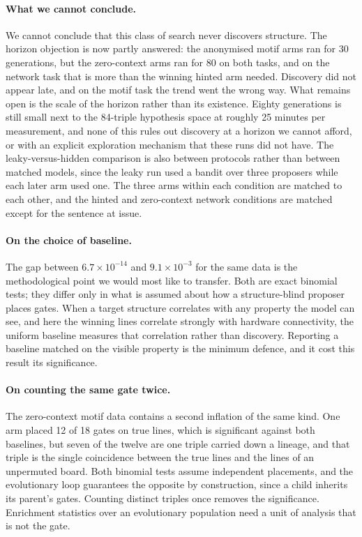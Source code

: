 \documentclass[11pt]{article}
\begin{document}
\paragraph{What we cannot conclude.}
We cannot conclude that this class of search never discovers structure. The
horizon objection is now partly answered: the anonymised motif arms ran for 30
generations, but the zero-context arms ran for 80 on both tasks, and on the
network task that is more than the winning hinted arm needed. Discovery did not
appear late, and on the motif task the trend went the wrong way. What remains
open is the scale of the horizon rather than its existence. Eighty generations is
still small next to the 84-triple hypothesis space at roughly 25 minutes per
measurement, and none of this rules out discovery at a horizon we cannot afford,
or with an explicit exploration mechanism that these runs did not have. The
leaky-versus-hidden comparison is also between protocols rather than between
matched models, since the leaky run used a bandit over three proposers while each
later arm used one. The three arms within each condition are matched to each
other, and the hinted and zero-context network conditions are matched except for
the sentence at issue.

\paragraph{On the choice of baseline.}
The gap between $6.7\times10^{-14}$ and $9.1\times10^{-3}$ for the same data is
the methodological point we would most like to transfer. Both are exact binomial
tests; they differ only in what is assumed about how a structure-blind proposer
places gates. When a target structure correlates with any property the model can
see, and here the winning lines correlate strongly with hardware connectivity, the
uniform baseline measures that correlation rather than discovery. Reporting a
baseline matched on the visible property is the minimum defence, and it cost this
result its significance.

\paragraph{On counting the same gate twice.}
The zero-context motif data contains a second inflation of the same kind. One
arm placed 12 of 18 gates on true lines, which is significant against both
baselines, but seven of the twelve are one triple carried down a lineage, and
that triple is the single coincidence between the true lines and the lines of an
unpermuted board. Both binomial tests assume independent placements, and the
evolutionary loop guarantees the opposite by construction, since a child inherits
its parent's gates. Counting distinct triples once removes the significance.
Enrichment statistics over an evolutionary population need a unit of analysis
that is not the gate.
\end{document}
